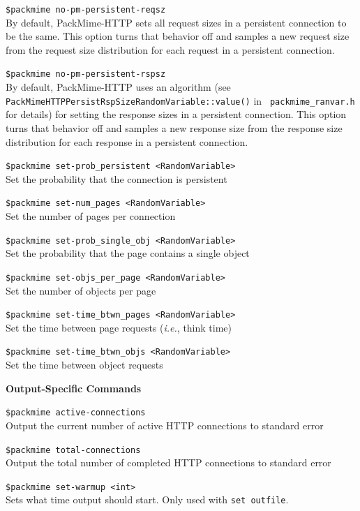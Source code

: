 {\tt \$packmime no-pm-persistent-reqsz}\\
By default, PackMime-HTTP sets all request sizes in a persistent
connection to be the same. This option turns that behavior off and
samples a new request size from the request size distribution for each
request in a persistent connection.

{\tt \$packmime no-pm-persistent-rspsz}\\
By default, PackMime-HTTP uses an algorithm (see {\tt
  PackMimeHTTPPersistRspSizeRandomVariable::value()} in {\tt
  packmime\_ranvar.h} for details) for setting the response sizes in a
persistent connection.  This option turns that behavior off and
samples a new response size from the response size distribution for
each response in a persistent connection.

{\tt \$packmime set-prob\_persistent <RandomVariable>}\\
Set the probability that the connection is persistent

{\tt \$packmime set-num\_pages <RandomVariable>}\\
Set the number of pages per connection

{\tt \$packmime set-prob\_single\_obj <RandomVariable>}\\
Set the probability that the page contains a single object

{\tt \$packmime set-objs\_per\_page <RandomVariable>}\\
Set the number of objects per page

{\tt \$packmime set-time\_btwn\_pages <RandomVariable>}\\
Set the time between page requests (\emph{i.e.}, think time)

{\tt \$packmime set-time\_btwn\_objs <RandomVariable>}\\
Set the time between object requests

{\bf Output-Specific Commands}

{\tt \$packmime active-connections}\\
Output the current number of active HTTP connections to standard error 

{\tt \$packmime total-connections}\\
Output the total number of completed HTTP connections to standard error

{\tt \$packmime set-warmup <int>}\\
Sets what time output should start.  Only used with {\tt set outfile}.

